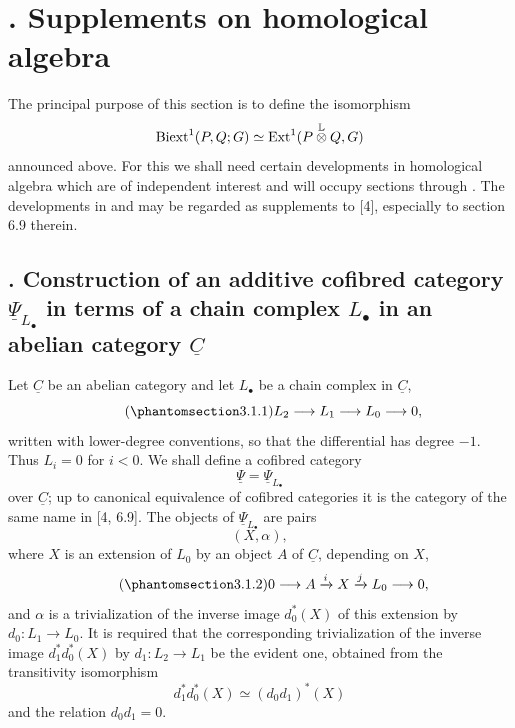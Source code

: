 
\section*{. Supplements on homological algebra}

The principal purpose of this section is to define the isomorphism
\[
 \operatorname{Biext}^1(P,Q;G)\simeq
 \operatorname{Ext}^1(P\overset{\mathbb L}{\otimes}Q,G)
\]
announced above. For this we shall need certain developments in
homological algebra which are of independent interest and will occupy
sections  through . The developments in  and  may be
regarded as supplements to [4], especially to section 6.9 therein.

\subsection*{. Construction of an additive cofibred category
$\underline\Psi_{L_\bullet}$ in terms of a chain complex $L_\bullet$
in an abelian category $\underline C$}

Let $\underline C$ be an abelian category and let $L_\bullet$ be a
chain complex in $\underline C$,
\begin{equation}\tag{\SGARefTarget{sga7.sga7i.evii.n3-1-1}{3.1.1}}
 L_2\longrightarrow L_1\longrightarrow L_0\longrightarrow0,
\end{equation}
written with lower-degree conventions, so that the differential has
degree $-1$. Thus $L_i=0$ for $i<0$. We shall define a cofibred
category
\[
 \underline\Psi=\underline\Psi_{L_\bullet}
\]
over $\underline C$; up to canonical equivalence of cofibred
categories it is the category of the same name in [4, 6.9]. The
objects of $\underline\Psi_{L_\bullet}$ are pairs
\[
 (X,\alpha),
\]
where $X$ is an extension of $L_0$ by an object $A$ of
$\underline C$, depending on $X$,
\begin{equation}\tag{\SGARefTarget{sga7.sga7i.evii.n3-1-2}{3.1.2}}
 0\longrightarrow A\xrightarrow{i}X\xrightarrow{j}L_0
 \longrightarrow0,
\end{equation}
and $\alpha$ is a trivialization of the inverse image $d_0^*(X)$ of
this extension by $d_0:L_1\longrightarrow L_0$. It is required that
the corresponding trivialization of the inverse image
$d_1^*d_0^*(X)$ by $d_1:L_2\longrightarrow L_1$ be the evident one,
obtained from the transitivity isomorphism
\[
 d_1^*d_0^*(X)\simeq(d_0d_1)^*(X)
\]
and the relation $d_0d_1=0$.

